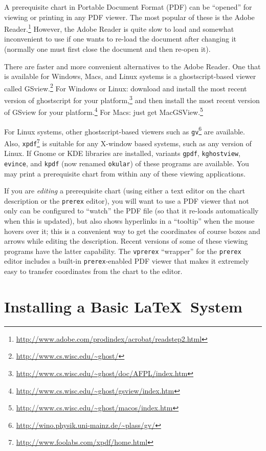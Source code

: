 \documentclass[11pt]{article}
\def\LaTeX{\mbox{LaTeX}}
\newcommand{\myurl}[1]{\textcolor{blue}{\underline{\textcolor{black}{\url{#1}}}}}
\begin{document}
A prerequisite chart in Portable Document Format (PDF) can be ``opened'' for
viewing or printing in any PDF viewer.  The most
popular of these is the 
Adobe Reader.\footnote{\myurl{http://www.adobe.com/prodindex/acrobat/readstep2.html}}
However, the Adobe Reader is quite slow to load and somewhat inconvenient to use
if one wants to re-load the document after changing it (normally one must first close the document and
then re-open it). 

There are faster and more convenient alternatives to the Adobe Reader. One 
that is
available for Windows, Macs, and Linux systems is a 
ghostscript-based viewer called 
GSview.\footnote{%
\myurl{http://www.cs.wisc.edu/~ghost/}}
For Windows or Linux: download and install the most recent version of 
ghostscript for your platform,\footnote{%
\myurl{http://www.cs.wisc.edu/~ghost/doc/AFPL/index.htm}}
and then install the most recent version of 
GSview for your platform.\footnote{%
\myurl{http://www.cs.wisc.edu/~ghost/gsview/index.htm}}
For Macs: just get
MacGSView.\footnote{%
\myurl{http://www.cs.wisc.edu/~ghost/macos/index.htm}}

For Linux systems, other ghostscript-based viewers such as 
\texttt{gv}\footnote{%
\myurl{http://wino.physik.uni-mainz.de/~plass/gv/}}
are available.  Also, 
\texttt{xpdf}\footnote{%
\myurl{http://www.foolabs.com/xpdf/home.html}}
is suitable for any X-window based systems, such as any version of Linux.
If Gnome or KDE libraries are installed, variants \texttt{gpdf}, \texttt{kghostview}, \texttt{evince}, and \texttt{kpdf} (now renamed \texttt{okular}) of these programs are available.
You may print a prerequisite chart from within any of these viewing applications.  

If you are \emph{editing} a prerequisite chart (using either a text editor on the
chart description or
the \texttt{prerex} editor), you will want to use a PDF viewer that
not only can be configured to ``watch'' the PDF file (so that it re-loads
automatically when this is updated), but also 
shows hyperlinks
in a ``tooltip'' when the mouse hovers over it; this is a convenient way to get
the coordinates of course boxes and arrows while editing the description.
Recent versions of some of these viewing programs have the latter capability.
The \texttt{vprerex} ``wrapper'' for the \texttt{prerex} editor includes
a built-in \texttt{prerex}-enabled PDF viewer that makes it extremely easy to
transfer coordinates from the chart to the editor.


\section{Installing a Basic \LaTeX\ System}
\label{installing}
\end{document}
